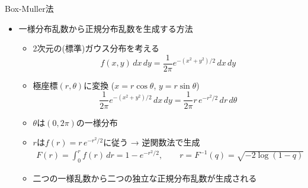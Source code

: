 
\begin{frame}[t,fragile]{Box-Muller法}
  \begin{itemize}
  \item 一様分布乱数から正規分布乱数を生成する方法
    \begin{itemize}
    \item 2次元の(標準)ガウス分布を考える
      \[
      f(x,y)\,dx\,dy= \frac{1}{2\pi} e^{-(x^2+y^2)/2} \,dx\,dy
      \]
    \item 極座標$(r,\theta)$に変換 ($x=r\cos\theta$, $y=r\sin\theta$)
      \[
      \frac{1}{2\pi} e^{-(x^2+y^2)/2} \,dx\,dy = \frac{1}{2\pi} r \, e^{-r^2/2} \,dr\,d\theta
      \]
    \item $\theta$は$(0,2\pi)$の一様分布
    \item $r$は$f(r) = r \, e^{-r^2/2}$に従う → 逆関数法で生成
      \begin{align*}
        F(r) = \int_0^r f(r) \, dr = 1 - e^{-r^2/2}, \qquad r = F^{-1}(q) = \sqrt{- 2 \log(1-q)}
      \end{align*}
    \item 二つの一様乱数から二つの独立な正規分布乱数が生成される
    \end{itemize}
  \end{itemize}
\end{frame}
